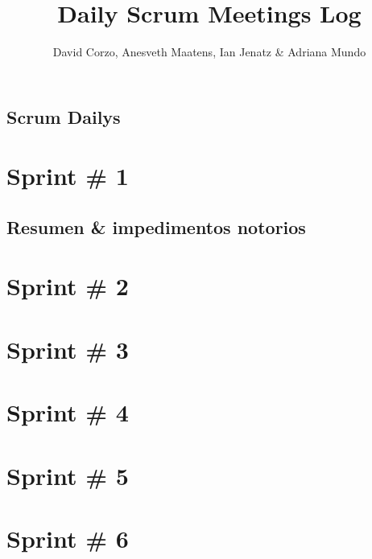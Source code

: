 \documentclass{book}
\title{Daily Scrum Meetings Log}
\author{David Corzo, Anesveth Maatens, Ian Jenatz \& Adriana Mundo}
\date{}
\begin{document}
\maketitle
\tableofcontents

\chapter{Scrum Dailys}


\part{Sprint \# 1}
\chapter{Resumen \& impedimentos notorios}


\part{Sprint \# 2}


\part{Sprint \# 3}


\part{Sprint \# 4}


\part{Sprint \# 5}


\part{Sprint \# 6}

\end{document}
